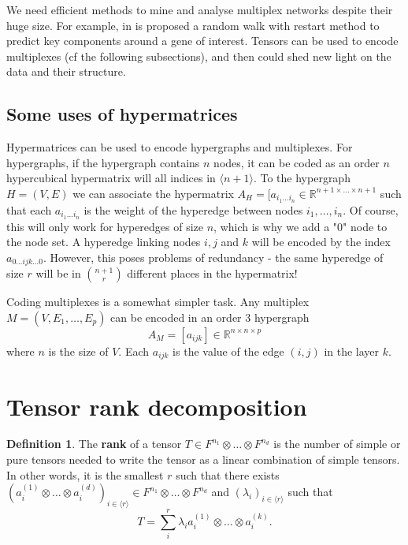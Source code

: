\documentclass{report}
\theoremstyle{definition}
\newtheorem{defin}{Definition}
\theoremstyle{remark}
\begin{document}
We need efficient methods to mine and analyse multiplex networks despite their huge size. For example, in \cite{valdeolivas} is proposed a random walk with restart method to predict key components around a gene of interest.
Tensors can be used to encode multiplexes (cf the following subsections), and then could shed new light on the data and their structure.


\subsection{Some uses of hypermatrices}

Hypermatrices can be used to encode hypergraphs and multiplexes.
For hypergraphs, if the hypergraph contains $n$ nodes, it can be coded as an order $n$ hypercubical hypermatrix will all indices in $\langle n + 1 \rangle$.
To the hypergraph $H = (V,E)$ we can associate the hypermatrix $A_H = [a_{i_1 \dots i_{n}} \in \mathbb{R}^{n+1 \times \dots \times n+1}$ such that each $a_{i_1 \dots i_n}$ is the weight of the hyperedge between nodes $i_1, \dots,i_n$. Of course, this will only work for hyperedges of size $n$, which is why we add a "$0$" node to the node set.
A hyperedge linking nodes $i,j$ and $k$ will be encoded by the index $a_{0\dots ijk \dots 0}$.
However, this poses problems of redundancy - the same hyperedge of size $r$ will be in $\binom{n+1}{r}$ different places in the hypermatrix!


Coding multiplexes is a somewhat simpler task. Any multiplex $M = (V,E_1,\dots,E_p)$ can be encoded in an order $3$ hypergraph
\begin{equation*}
        A_M = [a_{i j k}] \in \mathbb{R}^{n \times n \times p}
\end{equation*} where $n$ is the size of $V$. Each $a_{ijk}$ is the value of the edge $(i,j)$ in the layer $k$.


\section{Tensor rank decomposition}

\begin{defin}
        The \textbf{rank} of a tensor $T\in F^{n_1} \otimes \dots \otimes F^{n_d}$ is the number of simple or pure tensors needed to write the tensor as a linear combination of simple tensors.
        In other words, it is the smallest $r$ such that there exists $(a_i^{(1)} \otimes \dots \otimes a_i^{(d)})_{i \in \langle r \rangle} \in F^{n_1} \otimes \dots \otimes F^{n_d}$
        and $(\lambda_i)_{i \in \langle r \rangle}$ such that
        \begin{equation*}
                T = \sum_i^r \lambda_i a^{(1)}_i \otimes \dots \otimes a^{(k)}_i.
        \end{equation*}
\end{defin}
\end{document}
